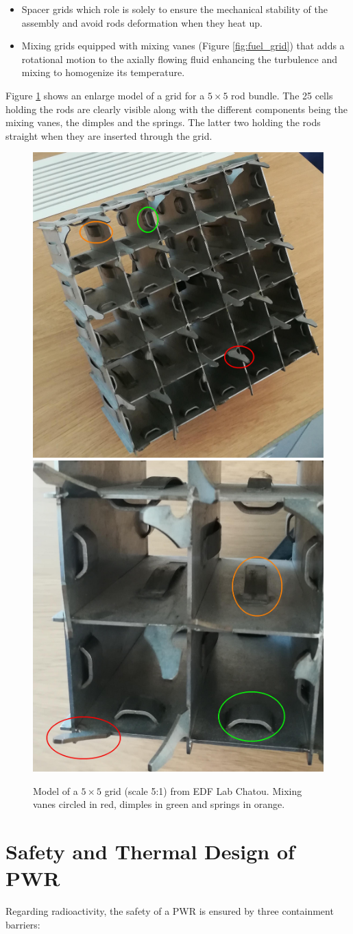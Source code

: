 \begin{itemize}
\item Spacer grids which role is solely to ensure the mechanical stability of the assembly and avoid rods deformation when they heat up.
\item Mixing grids equipped with mixing vanes (Figure \ref{fig:fuel_grid}) that adds a rotational motion to the axially flowing fluid enhancing the turbulence and mixing to homogenize its temperature.
\end{itemize}

Figure \ref{fig:fuel_grid_I8C} shows an enlarge model of a grid for a $5 \times 5$ rod bundle. The 25 cells holding the rods are clearly visible along with the different components being the mixing vanes, the dimples and the springs. The latter two holding the rods straight when they are inserted through the grid.


\begin{figure}[!h]
\centering
\includegraphics[width=0.3\linewidth]{img/intro/MaquetteGrille.png}
\includegraphics[width=0.3\linewidth]{img/intro/CanauxGrille.jpg}
\caption{Model of a $5 \times 5$ grid (scale 5:1) from EDF Lab Chatou. Mixing vanes circled in red, dimples in green and springs in orange.}
\label{fig:fuel_grid_I8C}
\end{figure}

\npar

\section{Safety and Thermal Design of PWR}

Regarding radioactivity, the safety of a PWR is ensured by three containment barriers:

